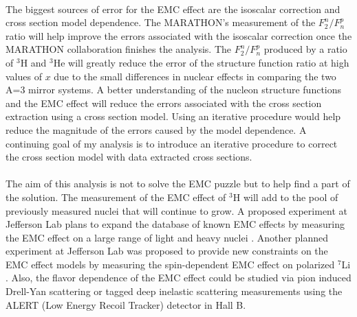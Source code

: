 \paragraph{}The biggest sources of error for the EMC effect are the isoscalar correction and cross section model dependence. The MARATHON's measurement of the $F^n_2/F^p_n$ ratio will help improve the errors associated with the isoscalar correction once the MARATHON collaboration finishes the analysis. The $F^n_2/F^p_n$ produced by a ratio of $^3$H and $^3$He will greatly reduce the error of the structure function ratio at high values of $x$ due to the small differences in nuclear effects in comparing the two A=3 mirror systems. A better understanding of the nucleon structure functions and the EMC effect will reduce the errors associated with the cross section extraction using a cross section model. Using an iterative procedure would help reduce the magnitude of the errors caused by the model dependence. A continuing goal of my analysis is to introduce an iterative procedure to correct the cross section model with data extracted cross sections. 

\paragraph{}The aim of this analysis is not to solve the EMC puzzle but to help find a part of the solution. The measurement of the EMC effect of $^3$H will add to the pool of previously measured nuclei that will continue to grow. A proposed experiment at Jefferson Lab plans to expand the database of known EMC effects by measuring the EMC effect on a large range of light and heavy nuclei \cite{pro_gaskell}. Another planned experiment at Jefferson Lab was proposed to provide new constraints on the EMC effect models by measuring the spin-dependent EMC effect on polarized $^7$Li \cite{pro_brooks}. Also, the flavor dependence of the EMC effect could be studied via pion induced Drell-Yan scattering\cite{Dutta} or tagged deep inelastic scattering measurements using the ALERT (Low Energy Recoil Tracker) detector in Hall B\cite{Armstrong}.


